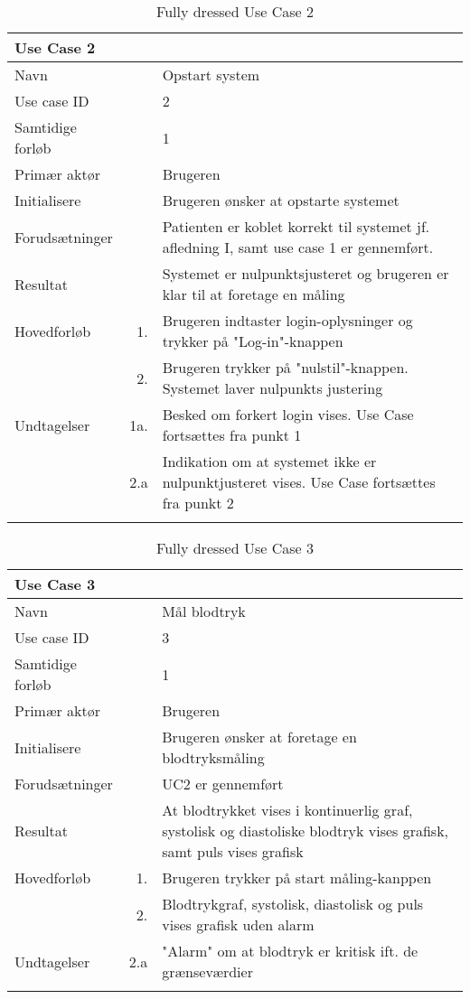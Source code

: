 \begin{longtabu} to  %
    {\large \textbf{Use Case 2}} && \\
    \toprule
    Navn &&    Opstart system\\
    Use case ID &&    2\\
    Samtidige forløb &&    1\\
    Primær aktør &&    Brugeren\\
    Initialisere &&    Brugeren ønsker at opstarte systemet\\
    Forudsætninger &&  Patienten er koblet korrekt til systemet jf. afledning I, samt use case 1 er gennemført.\\
    Resultat &&    Systemet er nulpunktsjusteret og brugeren er klar til at foretage en måling\\
    \midrule
    Hovedforløb &    1. &    Brugeren indtaster login-oplysninger og trykker på "Log-in"\--knappen \\
    	&			2. & Brugeren trykker på "nulstil"\--knappen. Systemet laver nulpunkts justering  \\ \midrule
    Undtagelser &    1a. & Besked om forkert login vises. Use Case fortsættes fra punkt 1     \\ 
    	&			2.a & Indikation om at systemet ikke er nulpunktjusteret vises. Use Case fortsættes fra punkt 2 \\ \bottomrule    
\caption{Fully dressed Use Case 2}
\label{UC2}
\end{longtabu}


\begin{longtabu} to  %
    {\large \textbf{Use Case 3}} && \\
    \toprule
    Navn &&    Mål blodtryk\\
    Use case ID &&    3\\
    Samtidige forløb &&    1\\
    Primær aktør &&    Brugeren\\
    Initialisere &&    Brugeren ønsker at foretage en blodtryksmåling\\
    Forudsætninger && UC2 er gennemført\\
    Resultat &&    At blodtrykket vises i kontinuerlig graf, systolisk og diastoliske blodtryk vises grafisk, samt puls vises grafisk                     \\ \midrule
    Hovedforløb &    1. &    Brugeren trykker på start måling\--kanppen\\
    			& 	 2. & Blodtrykgraf, systolisk, diastolisk og puls vises grafisk uden alarm \\ \midrule               
    Undtagelser &    2.a & "Alarm" om at blodtryk er kritisk ift. de grænseværdier \\ \bottomrule
\caption{Fully dressed Use Case 3}
\label{UC3}
\end{longtabu}

